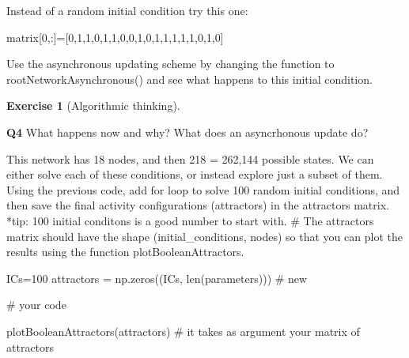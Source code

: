 \documentclass[
  letterpaper,
  DIV=11,
  numbers=noendperiod]{scrreprt}
\newenvironment{Shaded}{\begin{snugshade}}{\end{snugshade}}
\newcommand{\BuiltInTok}[1]{\textcolor[rgb]{0.00,0.23,0.31}{#1}}
\newcommand{\CommentTok}[1]{\textcolor[rgb]{0.37,0.37,0.37}{#1}}
\newcommand{\DecValTok}[1]{\textcolor[rgb]{0.68,0.00,0.00}{#1}}
\newcommand{\NormalTok}[1]{\textcolor[rgb]{0.00,0.23,0.31}{#1}}
\newcommand{\OperatorTok}[1]{\textcolor[rgb]{0.37,0.37,0.37}{#1}}
\theoremstyle{definition}
\newtheorem{exercise}{Exercise}[chapter]
\theoremstyle{remark}
\begin{document}
Instead of a random initial condition try this one:

\begin{Shaded}
\begin{Highlighting}[]
\NormalTok{matrix[}\DecValTok{0}\NormalTok{,:]}\OperatorTok{=}\NormalTok{[}\DecValTok{0}\NormalTok{,}\DecValTok{1}\NormalTok{,}\DecValTok{1}\NormalTok{,}\DecValTok{0}\NormalTok{,}\DecValTok{1}\NormalTok{,}\DecValTok{1}\NormalTok{,}\DecValTok{0}\NormalTok{,}\DecValTok{0}\NormalTok{,}\DecValTok{1}\NormalTok{,}\DecValTok{0}\NormalTok{,}\DecValTok{1}\NormalTok{,}\DecValTok{1}\NormalTok{,}\DecValTok{1}\NormalTok{,}\DecValTok{1}\NormalTok{,}\DecValTok{1}\NormalTok{,}\DecValTok{0}\NormalTok{,}\DecValTok{1}\NormalTok{,}\DecValTok{0}\NormalTok{]}
\end{Highlighting}
\end{Shaded}

Use the asynchronous updating scheme by changing the function to
rootNetworkAsynchronous() and see what happens to this initial
condition.

\begin{exercise}[Algorithmic
thinking]\protect\hypertarget{exr-non}{}\label{exr-non}

\textbf{Q4} What happens now and why? What does an asyncrhonous update
do?

\end{exercise}

This network has 18 nodes, and then 218 = 262,144 possible states. We
can either solve each of these conditions, or instead explore just a
subset of them. Using the previous code, add for loop to solve 100
random initial conditions, and then save the final activity
configurations (attractors) in the attractors matrix. *tip: 100 initial
conditons is a good number to start with. \# The attractors matrix
should have the shape (initial\_conditions, nodes) so that you can plot
the results using the function plotBooleanAttractors.

\begin{Shaded}
\begin{Highlighting}[]
\NormalTok{ICs}\OperatorTok{=}\DecValTok{100}
\NormalTok{attractors }\OperatorTok{=}\NormalTok{ np.zeros((ICs, }\BuiltInTok{len}\NormalTok{(parameters))) }\CommentTok{\# new}

\CommentTok{\# your code}

\NormalTok{plotBooleanAttractors(attractors) }\CommentTok{\# it takes as argument your matrix of attractors}
\end{Highlighting}
\end{Shaded}
\end{document}
